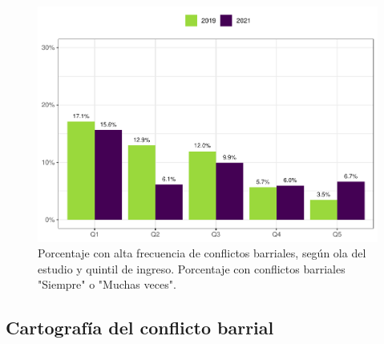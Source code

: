 \documentclass[
  12pt,
]{book}
\begin{document}
\begin{figure}

{\centering \includegraphics{reporte-elsoc_files/figure-latex/confli-quintil-1} 

}

\caption{Porcentaje con alta frecuencia de conflictos barriales, según ola del estudio y quintil de ingreso. Porcentaje con conflictos barriales "Siempre" o "Muchas veces".}\label{fig:confli-quintil}
\end{figure}

\hypertarget{cartografuxeda-del-conflicto-barrial}{%
\subsection{Cartografía del conflicto barrial}\label{cartografuxeda-del-conflicto-barrial}}
\end{document}
